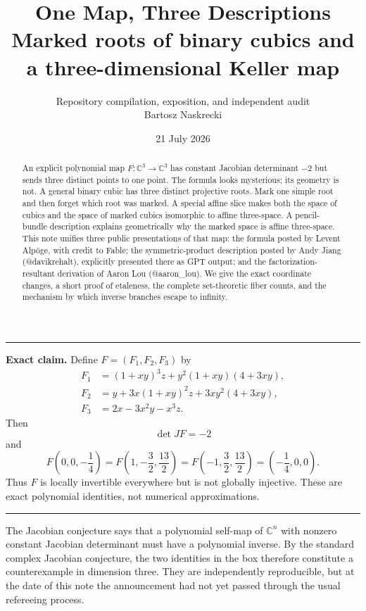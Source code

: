 \documentclass[11pt,a4paper]{article}
\title{\color{paperblue}\bfseries
  One Map, Three Descriptions\\[2mm]
  \large Marked roots of binary cubics and a three-dimensional Keller map}
\author{Repository compilation, exposition, and independent audit\\
  Bartosz Naskrecki}
\date{21 July 2026}
\theoremstyle{remark}
\newcommand{\C}{\mathbb C}
\newenvironment{summarybox}
  {\par\medskip\noindent\begin{minipage}{\textwidth}%
   \color{paperblue}\hrule\color{black}\vspace{0.65em}}
  {\vspace{0.35em}\color{paperblue}\hrule\color{black}%
   \end{minipage}\par\medskip}
\begin{document}
\maketitle

\begin{abstract}
An explicit polynomial map $F\colon\C^3\to\C^3$ has constant Jacobian
determinant $-2$ but sends three distinct points to one point.  The formula
looks mysterious; its geometry is not.  A general binary cubic has three
distinct projective roots.  Mark one simple root and then forget which root
was marked.  A special
affine slice makes both the space of cubics and the space of marked cubics
isomorphic to affine three-space.  A pencil-bundle description explains
geometrically why the marked space is affine three-space.  This note unifies three public
presentations of that map: the formula posted by Levent Alp\"oge, with credit
to Fable; the symmetric-product description posted by Andy Jiang
(@davikrehalt), explicitly presented there as GPT output; and the
factorization-resultant derivation of Aaron Lou (@aaron\_lou).  We give the
exact coordinate changes,
a short proof of etaleness, the complete set-theoretic fiber counts, and the
mechanism by which inverse branches escape to infinity.
\end{abstract}

\begin{summarybox}
\textbf{Exact claim.}
Define $F=(F_1,F_2,F_3)$ by
\begin{align*}
F_1&=(1+xy)^3z+y^2(1+xy)(4+3xy),\\
F_2&=y+3x(1+xy)^2z+3xy^2(4+3xy),\\
F_3&=2x-3x^2y-x^3z.
\end{align*}
Then
\[
  \det JF=-2
\]
and
\[
F\left(0,0,-\frac14\right)
=F\left(1,-\frac32,\frac{13}{2}\right)
=F\left(-1,\frac32,\frac{13}{2}\right)
=\left(-\frac14,0,0\right).
\]
Thus $F$ is locally invertible everywhere but is not globally injective.
These are exact polynomial identities, not numerical approximations.
\end{summarybox}

The Jacobian conjecture says that a polynomial self-map of $\C^n$ with
nonzero constant Jacobian determinant must have a polynomial inverse.  By the
standard complex Jacobian conjecture, the two identities in the box therefore
constitute a counterexample in dimension three.  They are independently
reproducible, but at the date of this note the announcement had not yet passed
through the usual refereeing process.
\end{document}
